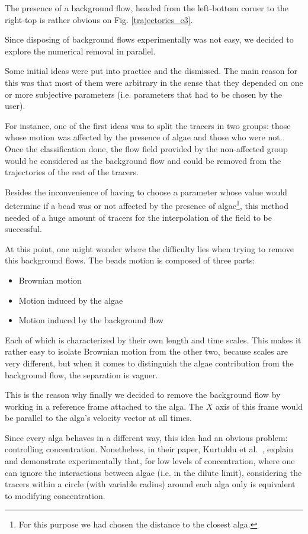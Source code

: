 The presence of a background flow, headed from the left-bottom corner to the right-top  is rather obvious on Fig. \ref{trajectories_e3}. 

Since disposing of background flows experimentally was not easy, we decided to explore the numerical removal in parallel.

Some initial ideas were put into practice and the dismissed. The main reason for this was that most of them were arbitrary in the sense that they depended on one or more subjective parameters (i.e. parameters that had to be chosen by the user). 

For instance, one of the first ideas was to split the tracers in two groups: those whose motion was affected by the presence of algae and those who were not. Once the classification done, the flow field provided by the non-affected group would be considered as the background flow and could be removed from the trajectories of the rest of the tracers.

Besides the inconvenience of having to choose a parameter whose value would determine if a bead was or not affected by the presence of algae\footnote{For this purpose we had chosen the distance to the closest alga.}, this method needed of a huge amount of tracers for the interpolation of the field to be successful. 

At this point, one might wonder where the difficulty lies when trying to remove this background flows. The beads motion is composed of three parts:

\begin{itemize}
	\item Brownian motion
	\item Motion induced by the algae 
	\item Motion induced by the background flow
\end{itemize}

Each of which is characterized by their own length and time scales. This makes it rather easy to isolate Brownian motion from the other two, because scales are very different, but when it comes to distinguish the algae contribution from the background flow, the separation is vaguer.

This is the reason why finally we decided to remove the background flow by working in a reference frame attached to the alga. The $X$ axis of this frame would be parallel to the alga's velocity vector at all times.

Since every alga behaves in a different way, this idea had an obvious problem: controlling concentration. Nonetheless, in their paper, Kurtuldu et al.~\cite{Kurtuldu2011}, explain and demonstrate experimentally that, for low levels of concentration, where one can ignore the interactions between algae (i.e. in the dilute limit), considering the tracers within a circle (with variable radius) around each alga only is equivalent to modifying concentration.  

